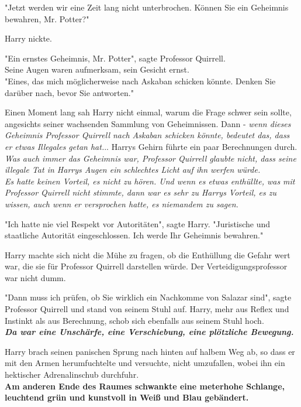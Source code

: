 {"Jetzt werden wir eine Zeit lang nicht unterbrochen. Können Sie ein Geheimnis bewahren, Mr. Potter?"

Harry nickte.

"Ein ernstes Geheimnis, Mr. Potter", sagte Professor Quirrell.\\ Seine Augen waren aufmerksam, sein Gesicht ernst.\\ "Eines, das mich möglicherweise nach Askaban schicken könnte. Denken Sie darüber nach, bevor Sie antworten."

Einen Moment lang sah Harry nicht einmal, warum die Frage schwer sein sollte, angesichts seiner wachsenden Sammlung von Geheimnissen. Dann - \emph{wenn dieses Geheimnis Professor Quirrell nach Askaban schicken könnte, bedeutet das, dass er etwas Illegales getan hat.}.. Harrys Gehirn führte ein paar Berechnungen durch.\\ \emph{Was auch immer das Geheimnis war, Professor Quirrell glaubte nicht, dass seine illegale Tat in Harrys Augen ein schlechtes Licht auf ihn werfen würde.\\ Es hatte keinen Vorteil, es nicht zu hören. Und wenn es etwas enthüllte, was mit Professor Quirrell nicht stimmte, dann war es sehr zu Harrys Vorteil, es zu wissen, auch wenn er versprochen hatte, es niemandem zu sagen.}

"Ich hatte nie viel Respekt vor Autoritäten", sagte Harry. "Juristische und staatliche Autorität eingeschlossen. Ich werde Ihr Geheimnis bewahren."

Harry machte sich nicht die Mühe zu fragen, ob die Enthüllung die Gefahr wert war, die sie für Professor Quirrell darstellen würde. Der Verteidigungsprofessor war nicht dumm.

"Dann muss ich prüfen, ob Sie wirklich ein Nachkomme von Salazar sind", sagte Professor Quirrell und stand von seinem Stuhl auf. Harry, mehr aus Reflex und Instinkt als aus Berechnung, schob sich ebenfalls aus seinem Stuhl hoch.\\ \textbf{\emph{Da war eine Unschärfe, eine Verschiebung, eine plötzliche Bewegung.}}

Harry brach seinen panischen Sprung nach hinten auf halbem Weg ab, so dass er mit den Armen herumfuchtelte und versuchte, nicht umzufallen, wobei ihn ein hektischer Adrenalinschub durchfuhr.\\

\textbf{Am anderen Ende des Raumes schwankte eine meterhohe Schlange, leuchtend grün und kunstvoll in Weiß und Blau gebändert.}

}
